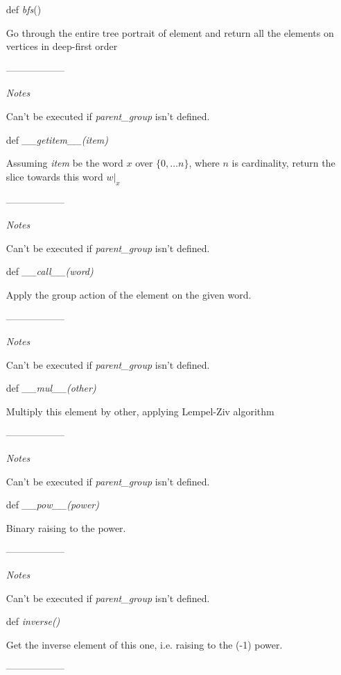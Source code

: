 \documentclass[a4paper,12pt]{amsart}
\begin{document}
\begin{itemize}
\begin{itemize}
		\item[def] \textit{bfs}()
		
		Go through the entire tree portrait of element and return all the elements on vertices in deep-first order

		------------------
		
		\textit{Notes}
		
		Can't be executed if \textit{parent\_group} isn't defined.
		
		\item[def] \textit{\_\_getitem\_\_(item)}
		
		Assuming \textit{item} be the word $x$ over $\{0, \dots n\}$, where $n$ is cardinality, return the slice towards this word $w|_x$
		
		------------------
		
		\textit{Notes}
		
		Can't be executed if \textit{parent\_group} isn't defined.
		
		\item[def] \textit{\_\_call\_\_(word)}
		
		Apply the group action of the element on the given word. 
		
		------------------
		
		\textit{Notes}
		
		Can't be executed if \textit{parent\_group} isn't defined.
		
		
		\item[def] \textit{\_\_mul\_\_(other)}
		
		Multiply this element by other, applying Lempel-Ziv algorithm
		
		------------------
		
		\textit{Notes}
		
		Can't be executed if \textit{parent\_group} isn't defined.
		
		
		\item[def] \textit{\_\_pow\_\_(power)}
		
		Binary raising to the power. 
		
		------------------
		
		\textit{Notes}
		
		Can't be executed if \textit{parent\_group} isn't defined.
		
		
		\item[def] \textit{inverse()}
		
		Get the inverse element of this one, i.e. raising to the (-1) power. 
		
		------------------
		

\end{itemize}
\end{itemize}
\end{document}
